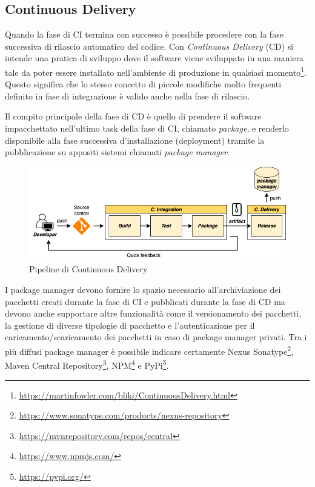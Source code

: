 \subsection{Continuous Delivery}
\label{cd-sec}
Quando la fase di CI termina con successo è possibile procedere con la fase successiva di rilascio automatico del codice. 
Con \textit{Continuous Delivery} (CD) si intende una pratica di sviluppo dove il software viene sviluppato in una maniera tale da poter essere installato nell'ambiente di produzione in qualsiasi momento\footnote{\href{https://martinfowler.com/bliki/ContinuousDelivery.html}{https://martinfowler.com/bliki/ContinuousDelivery.html}}. 
Questo significa che lo stesso concetto di piccole modifiche molto frequenti definito in fase di integrazione è valido anche nella fase di rilascio.

Il compito principale della fase di CD è quello di prendere il software impacchettato nell'ultimo task della fase di CI, 
chiamato \textit{package}, e renderlo disponibile alla fase successiva d'installazione (deployment) tramite la pubblicazione su appositi sistemi chiamati \textit{package manager}.

\begin{figure}[H]
    \centering
    \includegraphics[width=1\textwidth]{img/cd-pipeline.png}
    \caption{Pipeline di Continuous Delivery}
    \label{cd-pipeline}
\end{figure}

I package manager devono fornire lo spazio necessario all'archiviazione dei pacchetti creati durante la fase di CI e pubblicati durante la fase di CD ma devono anche supportare altre funzionalità come il versionamento dei pacchetti, la gestione di diverse tipologie di pacchetto e l'autenticazione per il caricamento/scaricamento dei pacchetti in caso di package manager privati.
Tra i più diffusi package manager è possibile indicare certamente Nexus Sonatype\footnote{\href{https://www.sonatype.com/products/nexus-repository}{https://www.sonatype.com/products/nexus-repository}}, 
Maven Central Repository\footnote{\href{https://mvnrepository.com/repos/central}{https://mvnrepository.com/repos/central}},
NPM\footnote{\href{https://www.npmjs.com/}{https://www.npmjs.com/}} e PyPi\footnote{\href{https://pypi.org/}{https://pypi.org/}}.

